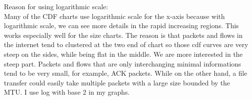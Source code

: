 \documentclass{article}
\begin{document}
Reason for using logarithmic scale:\\
Many of the CDF charts use logarithmic scale for the x-axis because with logarithmic scale, we can see more details in the rapid increasing regions. This works especially well for the size charts. The reason is that packets and flows in the internet tend to clustered at the two end of chart so those cdf curves are very steep on the sides, while being flat in the middle. We are more interested in the steep part. Packets and flows that are only interchanging minimal informations tend to be very small, for example, ACK packets. While on the other hand, a file transfer could easily take multiple packets with a large size bounded by the MTU. I use log with base 2 in my graphs.
\clearpage
\end{document}
